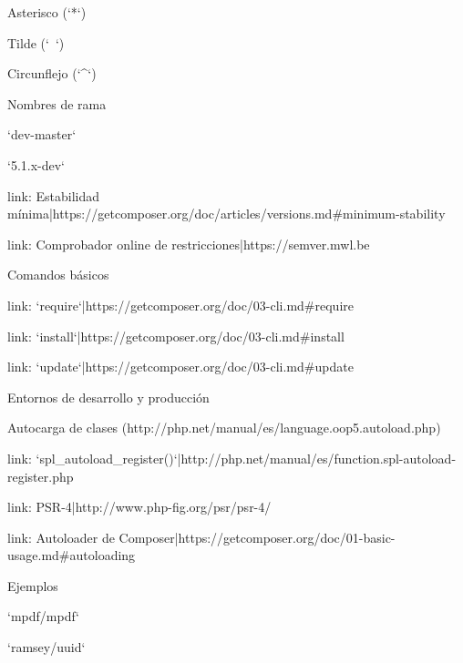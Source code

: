 \begin{longenum}
\begin{longenum}
\begin{longenum}
\begin{longenum}
                \item Asterisco (`*`)
                \item Tilde (`~`)
                \item Circunflejo (`^`)
                \item Nombres de rama
                \begin{longenum}
                    \item `dev-master`
                    \item `5.1.x-dev`
                \end{longenum}
                \item [link: Estabilidad mínima|https://getcomposer.org/doc/articles/versions.md#minimum-stability]
                \item [link: Comprobador online de restricciones|https://semver.mwl.be]
            \end{longenum}
            \item Comandos básicos
            \begin{longenum}
                \item [link: `require`|https://getcomposer.org/doc/03-cli.md#require]
                \item [link: `install`|https://getcomposer.org/doc/03-cli.md#install]
                \item [link: `update`|https://getcomposer.org/doc/03-cli.md#update]
            \end{longenum}
            \item Entornos de desarrollo y producción
        \end{longenum}
        \item [Autocarga de clases](http://php.net/manual/es/language.oop5.autoload.php)
        \begin{longenum}
            \item [link: `spl_autoload_register()`|http://php.net/manual/es/function.spl-autoload-register.php]
            \item [link: PSR-4|http://www.php-fig.org/psr/psr-4/]
            \item [link: Autoloader de Composer|https://getcomposer.org/doc/01-basic-usage.md#autoloading]
        \end{longenum}
        \item Ejemplos
        \begin{longenum}
            \item `mpdf/mpdf`
            \item `ramsey/uuid`

\end{longenum}
\end{longenum}
\end{longenum}
